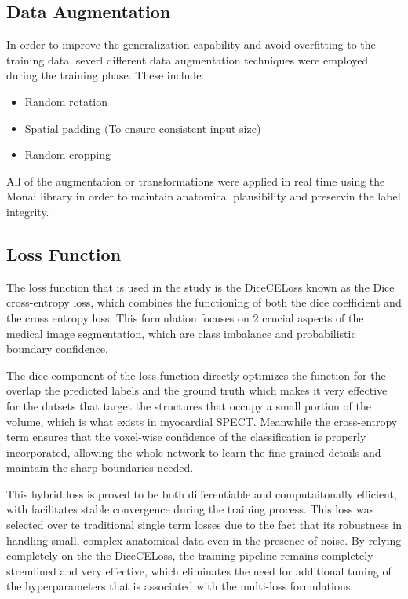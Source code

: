 \subsection{Data Augmentation}
In order to improve the generalization capability and avoid overfitting to the training data, severl different data augmentation techniques were employed during the training phase. These include: 
\begin{itemize}
\item Random rotation \item Spatial padding (To ensure consistent input size) \item Random cropping 
\end{itemize}

All of the augmentation or transformations were applied in real time using the Monai library in order to maintain anatomical plausibility and preservin the label integrity.

\subsection{Loss Function}
The loss function that is used in the study is the DiceCELoss known as the Dice cross-entropy loss, which combines the functioning of both the dice coefficient and the cross entropy loss. This formulation focuses on 2 crucial aspects of the medical image segmentation, which are class imbalance and probabilistic boundary confidence.

The dice component of the loss function directly optimizes the function for the overlap the predicted labels and the ground truth which makes it very effective for the datsets that target the structures that occupy a small portion of the volume, which is what exists in myocardial SPECT. Meanwhile the cross-entropy term ensures that the voxel-wise confidence of the classification is properly incorporated, allowing the whole network to learn the fine-grained details and maintain the sharp boundaries needed.

This hybrid loss is proved to be both differentiable and computaitonally efficient, with facilitates stable convergence during the training process. This loss was selected over te traditional single term losses due to the fact that its robustness in handling small, complex anatomical data even in the presence of noise. By relying completely on the the DiceCELoss, the training pipeline remains completely stremlined and very effective, which eliminates the need for additional tuning of the hyperparameters that is associated with the multi-loss formulations.


